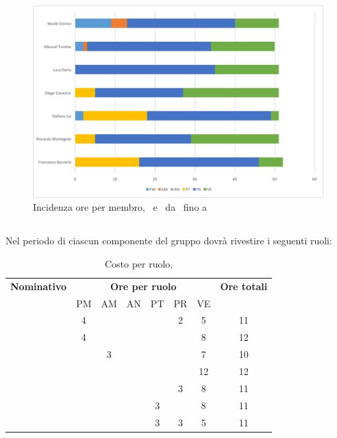 \begin{figure}[H]
	\centering 
	\includegraphics[scale=0.7]{Immagini/GraficiPianoLavoro/COD.png}
	\caption{Incidenza ore per membro, \PD\ e \COD\ da \RP\ fino a \RQ}
\end{figure}

\newpage
\subsection{\VV}
Nel periodo di \VV{} ciascun componente del gruppo dovrà rivestire i seguenti ruoli:

\begin{table}[h]
	\begin{center}
		\begin{tabular}{|c|c|c|c|c|c|c|c|}
			\hline
			\textbf{Nominativo} & \multicolumn{6}{c|}{\textbf{Ore per ruolo}} & \textbf{Ore totali} \\
					& PM & AM & AN & PT & PR & VE & \\
			\hline
			\FB		& 4  &	  &	   & 	&	2 & 5 &	11	\\
			\hline
			\RM		& 4	 &	  &	   &	&	 & 8 & 12	\\
			\hline
			\SL		&	 & 3  &	   &	&	 & 7 &	10	\\
			\hline
			\DC		& 	 &	  &  &   &	 & 12 &	12	\\
			\hline
			\LD 	&	 &	  &	   & 	&	3 & 8 &	11	\\
			\hline
			\MT		&  	 &	  &   & 3 	&	 & 8 &	11	\\
			\hline
			\ND 	&	 &   &	   & 3	&	3 & 5 & 11	\\
			\hline
		\end{tabular}
	\end{center}
	\caption{Costo per ruolo, \VV}
\end{table}

